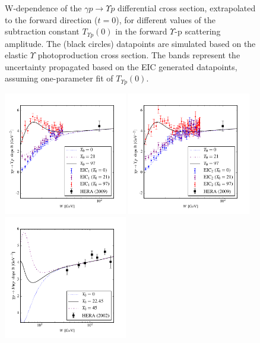 \documentclass[10pt,prd,aps,nofootinbib,superscriptaddress]{revtex4}
\begin{document}
\begin{figure}
\caption{W-dependence of the $\gamma p \to \Upsilon p$ differential cross section, extrapolated to the forward direction ($t=0$), 
for different values of the subtraction constant $T_{\Upsilon p} (0)$ in the forward $\Upsilon$-p scattering amplitude.
The (black circles) datapoints are simulated based on the elastic $\Upsilon$ photoproduction cross section.
The bands represent the uncertainty propagated based on the EIC generated datapoints,
assuming one-parameter fit of $T_{\Upsilon p}(0)$.}
\label{fig:dsigmadt0}
\end{figure}


\begin{figure}
\includegraphics[width=0.48\textwidth]{b_slope_eic1.pdf}
\includegraphics[width=0.48\textwidth]{b_slope_eic2.pdf}
\includegraphics[width=0.48\textwidth]{b_slope_jpsi.pdf}

\end{figure}
\end{document}
